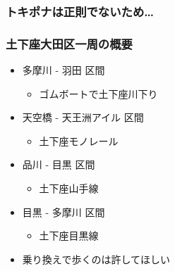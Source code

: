 \documentclass[14pt]{beamer}
\theoremstyle{definition}
\begin{document}
\begin{frame}
	\frametitle{トキポナは正則でないため…}
\end{frame}


\begin{frame}
	\frametitle{土下座大田区一周の概要}

	\begin{itemize}
		\item 多摩川 - 羽田 区間
			\begin{itemize}
				\item ゴムボートで土下座川下り
			\end{itemize}
		\item 天空橋 - 天王洲アイル 区間
			\begin{itemize}
				\item 土下座モノレール
			\end{itemize}
		\item 品川 - 目黒 区間
			\begin{itemize}
				\item 土下座山手線
			\end{itemize}
		\item 目黒 - 多摩川 区間
			\begin{itemize}
				\item 土下座目黒線
			\end{itemize}
		\item 乗り換えで歩くのは許してほしい
	\end{itemize}
\end{frame}


\begin{frame}
	\begin{center}
		{\Huge \liberation \color{cyan} }
	\end{center}
\end{frame}
\end{document}
